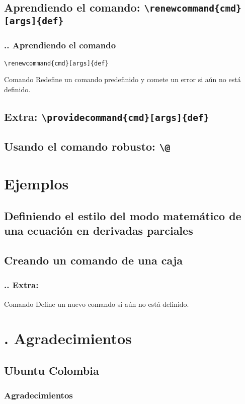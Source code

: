 \documentclass[12pt]{beamer}
\begin{document}
\cprotect\subsection{Aprendiendo el comando: \verb!\renewcommand{cmd}[args]{def}!}

\begin{frame}[fragile]
\frametitle{\thesection.\thesubsection. Aprendiendo el comando }
\vspace*{-2cm}
\centering
\verb|\renewcommand{cmd}[args]{def}|

\begin{block}{Comando }
Redefine un comando predefinido y comete un error si aún no está definido.
\end{block}
\end{frame}

\cprotect\subsection{Extra: \verb!\providecommand{cmd}[args]{def}!}
\cprotect\subsection{Usando el comando robusto: \verb!\@!}

\section{Ejemplos}

\subsection{Definiendo el estilo del modo matemático de una ecuación en derivadas parciales}
\subsection{Creando un comando de una caja}

\begin{frame}
\frametitle{\thesection.\thesubsection. Extra: }

\begin{alertblock}{Comando }
Define un nuevo comando si aún no está definido.
\end{alertblock}
\end{frame}

\section{\thesection. Agradecimientos}
\subsection{Ubuntu Colombia}
\begin{frame}
\frametitle{Agradecimientos}
 \end{frame}
\end{document}
